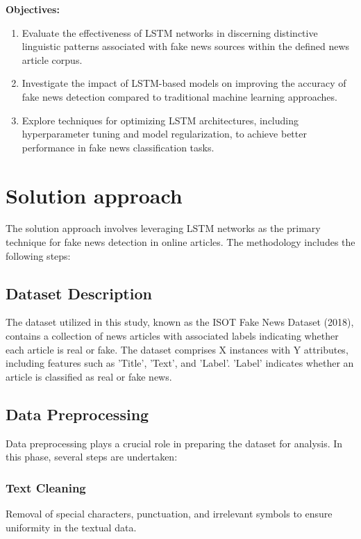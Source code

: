 \textbf{Objectives:} 
\begin{enumerate}
    \item Evaluate the effectiveness of LSTM networks in discerning distinctive linguistic patterns associated with fake news sources within the defined news article corpus.\citep{fake-news} 
    \item Investigate the impact of LSTM-based models on improving the accuracy of fake news detection compared to traditional machine learning approaches. 
    \item Explore techniques for optimizing LSTM architectures, including hyperparameter tuning and model regularization, to achieve better performance in fake news classification tasks. 
\end{enumerate}
 



\section{Solution approach}
\label{sec:intro_sol} %
The solution approach involves leveraging LSTM networks as the primary technique for fake news detection in online articles. The methodology includes the following steps:

\subsection{Dataset Description}

The dataset utilized in this study, known as the ISOT Fake News Dataset (2018), contains a collection of news articles with associated labels indicating whether each article is real or fake. The dataset comprises X instances with Y attributes, including features such as 'Title', 'Text', and 'Label'. 'Label' indicates whether an article is classified as real or fake news.

\subsection{Data Preprocessing}

Data preprocessing plays a crucial role in preparing the dataset for analysis. In this phase, several steps are undertaken:

\subsubsection{Text Cleaning}Removal of special characters, punctuation, and irrelevant symbols to ensure uniformity in the textual data.
